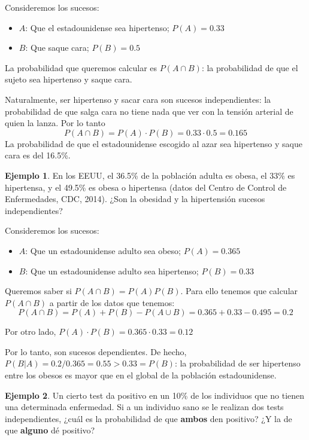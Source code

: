 \documentclass[
]{book}
\theoremstyle{definition}
\theoremstyle{definition}
\newtheorem{example}{Ejemplo}[chapter]
\theoremstyle{definition}
\theoremstyle{definition}
\theoremstyle{remark}
\begin{document}
Consideremos los sucesos:

\begin{itemize}
\item
  \(A\): Que el estadounidense sea hipertenso; \(P(A)=0.33\)
\item
  \(B\): Que saque cara; \(P(B)=0.5\)
\end{itemize}

La probabilidad que queremos calcular es \(P(A\cap B)\): la probabilidad de que el sujeto sea hipertenso y saque cara.

Naturalmente, ser hipertenso y sacar cara son sucesos independientes: la probabilidad de que salga cara no tiene nada que ver con la tensión arterial de quien la lanza. Por lo tanto
\[
P(A\cap B)=P(A)\cdot P(B)=0.33\cdot 0.5=0.165
\]
La probabilidad de que el estadounidense escogido al azar sea hipertenso y saque cara es del 16.5\%.

\begin{example}
\protect\hypertarget{exm:unnamed-chunk-128}{}\label{exm:unnamed-chunk-128}En los EEUU, el 36.5\% de la población adulta es obesa, el 33\% es hipertensa, y el 49.5\% es obesa o hipertensa (datos del Centro de Control de Enfermedades, CDC, 2014). ¿Son la obesidad y la hipertensión sucesos independientes?
\end{example}

Consideremos los sucesos:

\begin{itemize}
\item
  \(A\): Que un estadounidense adulto sea obeso; \(P(A)=0.365\)
\item
  \(B\): Que un estadounidense adulto sea hipertenso; \(P(B)=0.33\)
\end{itemize}

Queremos saber si \(P(A\cap B)=P(A)P(B)\). Para ello tenemos que calcular \(P(A\cap B)\) a partir de los datos que tenemos:
\[
P(A \cap B)  =P(A)+P(B)-P(A\cup B)=0.365+0.33-0.495=0.2
\]

Por otro lado, \(P(A)\cdot P(B)= 0.365\cdot 0.33=0.12\)

Por lo tanto, son sucesos dependientes. De hecho, \(P(B|A)=0.2/0.365=0.55> 0.33=P(B)\): la probabilidad de ser hipertenso entre los obesos es mayor que en el global de la población estadounidense.

\begin{example}
\protect\hypertarget{exm:unnamed-chunk-129}{}\label{exm:unnamed-chunk-129}Un cierto test da positivo en un 10\% de los individuos que no tienen una determinada enfermedad. Si a un individuo sano se le realizan dos tests independientes, ¿cuál es la probabilidad de que \textbf{ambos} den positivo? ¿Y la de que \textbf{alguno} dé positivo?
\end{example}
\end{document}
